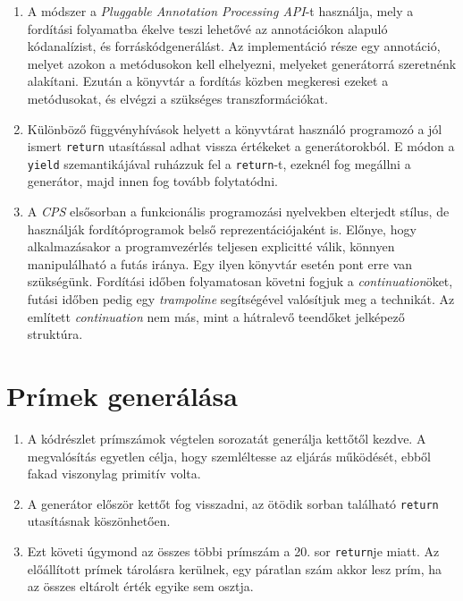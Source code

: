 \documentclass[12pt, a4paper]{article}
\begin{document}
\begin{enumerate}
    \item
    A módszer a \textit{Pluggable Annotation Processing API}-t használja, mely a fordítási folyamatba ékelve teszi lehetővé az annotációkon alapuló kódanalízist, és forráskódgenerálást. Az implementáció része egy annotáció, melyet azokon a metódusokon kell elhelyezni, melyeket generátorrá szeretnénk alakítani. Ezután a könyvtár a fordítás közben megkeresi ezeket a metódusokat, és elvégzi a szükséges transzformációkat.
    \item
    Különböző függvényhívások helyett a könyvtárat használó programozó a jól ismert \texttt{return} utasítással adhat vissza értékeket a generátorokból. E módon a \texttt{yield} szemantikájával ruházzuk fel a \texttt{return}-t, ezeknél fog megállni a generátor, majd innen fog tovább folytatódni.
    \item
    A \textit{CPS} elsősorban a funkcionális programozási nyelvekben elterjedt stílus, de használják fordítóprogramok belső reprezentációjaként is. Előnye, hogy alkalmazásakor a programvezérlés teljesen explicitté válik, könnyen manipulálható a futás iránya. Egy ilyen könyvtár esetén pont erre van szükségünk. Fordítási időben folyamatosan követni fogjuk a \textit{continuation}öket, futási időben pedig egy \textit{trampoline} segítségével valósítjuk meg a technikát. Az említett \textit{continuation} nem más, mint a hátralevő teendőket jelképező struktúra.
\end{enumerate}

\section{Prímek generálása}

\begin{enumerate}
    \item
    A kódrészlet prímszámok végtelen sorozatát generálja kettőtől kezdve. A megvalósítás egyetlen célja, hogy szemléltesse az eljárás működését, ebből fakad viszonylag primitív volta.
    \item
    A generátor először kettőt fog visszadni, az ötödik sorban található \texttt{return} utasításnak köszönhetően.
    \item
    Ezt követi úgymond az összes többi prímszám a 20. sor \texttt{return}je miatt.  Az előállított prímek tárolásra kerülnek, egy páratlan szám akkor lesz prím, ha az összes eltárolt érték egyike sem osztja.
\end{enumerate}
\end{document}
